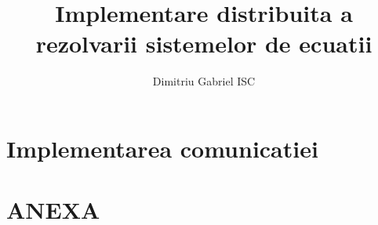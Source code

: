 \documentclass [12pt]{report}
\title{Implementare distribuita a rezolvarii sistemelor de ecuatii}
\author{Dimitriu Gabriel ISC}
\date{}
\begin{document}
\maketitle
\tableofcontents


\chapter{Implementarea comunicatiei}



\chapter{ANEXA}




\end{document}
